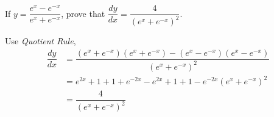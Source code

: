 

\question[3] If $y=\dfrac{e^x - e^{-x}}{e^x + e^{-x}}$, prove that 
$\dfrac{dy}{dx}=\dfrac{4}{\left(e^x + e^{-x}\right)^2}$.

\begin{solution}[\mcq]
  Use \textit{Quotient Rule},
  \begin{align}
      \dfrac{dy}{dx}&=\dfrac{(e^x + e^{-x})(e^x + e^{-x})-
                             (e^x - e^{-x})(e^x - e^{-x})}
                            {(e^x + e^{-x})^2} \\
                    &={e^{2x}+1+1+e^{-2x}-e^{2x}+1+1-e^{-2x}}
                            {(e^x + e^{-x})^2} \\
                    &=\dfrac{4}{(e^x + e^{-x})^2}
  \end{align}
\end{solution}

